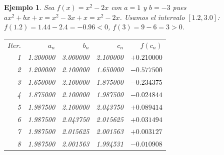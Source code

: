 \documentclass[12pt]{article}
\newtheorem{Ejem}{Ejemplo}%
\begin{document}
\begin{Ejem}

Sea $f(x)=x^2 - 2x$ con $a=1$ y $b=-3$ pues $ax^2+bx+x=x^2-3x+x=x^2-2x$. Usamos el intervalo $[1.2,3.0]$: $f(1.2)=1.44-2.4=-0.96<0$, $f(3)=9-6=3>0$.

\begin{center}
\begin{tabular}{@{}rrrrr@{}}
Iter. & $a_n$ & $b_n$ & $c_n$ & $f(c_n)$ \\
1 & 1.200000 & 3.000000 & 2.100000 & $+0.210000$ \\
2 & 1.200000 & 2.100000 & 1.650000 & $-0.577500$ \\
3 & 1.650000 & 2.100000 & 1.875000 & $-0.234375$ \\
4 & 1.875000 & 2.100000 & 1.987500 & $-0.024844$ \\
5 & 1.987500 & 2.100000 & 2.043750 & $+0.089414$ \\
6 & 1.987500 & 2.043750 & 2.015625 & $+0.031494$ \\
7 & 1.987500 & 2.015625 & 2.001563 & $+0.003127$ \\
8 & 1.987500 & 2.001563 & 1.994531 & $-0.010908$ \\
\end{tabular}
\end{center}
\end{Ejem}
\end{document}
